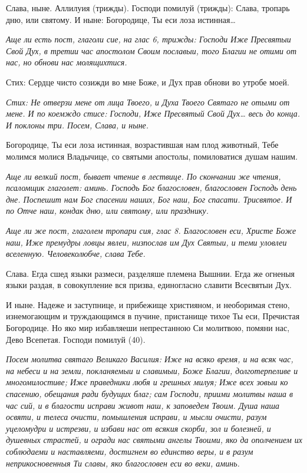 Слава, ныне. Аллилуия (трижды). Господи помилуй (трижды): Слава, тропарь дню, или святому. И ныне: Богородице, Ты еси лоза истинная…


\itshape Аще ли есть пост, глаголи сие, на глас 6, трижды:\normalfont{} Господи Иже Пресвятыи Свой Дух, в третии час апостолом Своим пославыи, того Благии не отими от нас, но обнови нас молящихтися.

Стих: Сердце чисто созижди во мне Боже, и Дух прав обнови во утробе моей.


\itshape Стих:\normalfont{} Не отверзи мене от лица Твоего, и Духа Твоего Святаго не отыми от мене. И по коемждо стисе: Господи, Иже Пресвятый Свой Дух… весь до конца. И поклоны три. Посем, Слава, и ныне. 

Богородице, Ты еси лоза истинная, возрастившая нам плод животный, Тебе молимся молися Владычице, со святыми апостолы, помиловатися душам нашим.


\itshape Аще ли велкий пост, бывает чтение в лествице.\normalfont{} По скончании же чтения, псаломщик глаголет: аминь. Господь Бог благословен, благословен Господь день дне. Поспешит нам Бог спасении наших, Бог наш, Бог спасати. Трисвятое. И по Отче наш, кондак дню, или святому, или празднику.


\itshape Аще ли же пост, глаголем тропари сия, глас 8.\normalfont{} Благословен еси, Христе Боже наш, Иже премудры ловцы явлеи, низпослав им Дух Святыи, и теми уловлеи вселенную. Человеколюбче, слава Тебе.

Слава. Егда сшед языки размеси, разделяше племена Вышнии. Егда же огненыя языки раздая, в совокупление вся призва, единогласно славити Всесвятыи Дух.

И ныне. Надеже и заступнице, и прибежище християном, и необоримая стено, изнемогающим и труждающимся в пучине, пристанище тихое Ты еси, Пречистая Богородице. Но яко мир избавляеши непрестанною Си молитвою, помяни нас, Дево Всепетая. Господи помилуй (40).


\itshape Посем молитва святаго Великаго Василия:\normalfont{} Иже на всяко время, и на всяк час, на небеси и на земли, покланяемыи и славимыи, Боже Благии, долготерпеливе и многомилостиве; Иже праведники любя и грешных милуя; Иже всех зовыи ко спасению, обещания ради будущих благ; сам Господи, приими молитвы наша в час сий, и в благости исправи живот наш, к заповедем Твоим. Душа наша освяти, и телеса очисти, помышления исправи, и мысли очисти, разум уцеломудри и истрезви, и избави нас от всякия скорби, зол и болезней, и душевных страстей, и огради нас святыми ангелы Твоими, яко да ополчением их соблюдаеми и наставляеми, достигнем во единство веры, и в разум неприкосновенныя Ти славы, яко благословен еси во веки, аминь. 

